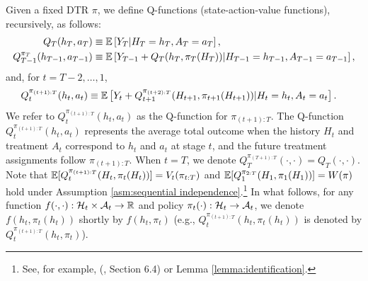 Given a fixed DTR $\pi$, we define Q-functions (state-action-value functions), recursively, as follows:
\begin{align}
    Q_T(h_T,a_T) &\equiv \mathbb{E}\left[Y_{T}|H_T = h_T, A_T = a_T\right], \label{eq:action_value_func_1}\\
     Q_{T-1}^{\pi_{T}}(h_{T-1},a_{T-1}) &\equiv \mathbb{E}\left[Y_{T-1} + Q_T(h_T,\pi_T(H_{T}))|H_{T-1} = h_{T-1}, A_{T-1} = a_{T-1}\right],
     \end{align}
     and, for $t=T-2,\ldots,1$,
     \begin{align}
     Q_{t}^{\pi_{(t+1):T}}(h_t,a_t) &\equiv \mathbb{E}\left[Y_{t} + Q_{t+1}^{\pi_{(t+2):T}}(H_{t+1},\pi_{t+1}(H_{t+1}))|H_t = h_t, A_t = a_t\right]. \label{eq:state_value_func_2}
\end{align}
We refer to $Q_{t}^{\pi_{(t+1):T}}(h_t,a_t)$ as the Q-function for $\pi_{(t+1):T}$. 
The Q-function $Q_{t}^{\pi_{(t+1):T}}(h_t,a_t)$ represents the average total outcome when the history $H_t$ and treatment $A_t$ correspond to $h_t$ and $a_t$ at stage $t$, and the future treatment assignments follow $\pi_{(t+1):T}$. 
When $t=T$, we denote $Q_{T}^{\pi_{(T+1):T}}(\cdot,\cdot) = Q_{T}(\cdot,\cdot)$.  Note that $\mathbb{E}[Q_{t}^{\pi_{(t+1):T}}(H_{t},\pi_{t}(H_{t}))] = V_{t}(\pi_{t:T})$ and $\mathbb{E}[Q_{1}^{\pi_{2:T}}(H_{1},\pi_{1}(H_{1}))] = W(\pi)$ hold under Assumption \ref{asm:sequential independence}.\footnote{See, for example, \citeauthor{Tsiatis_et_al_2019}(\citeyear{Tsiatis_et_al_2019}, Section 6.4) or Lemma \ref{lemma:identification}.} 
In what follows, for any function $f(\cdot,\cdot):\mathcal{H}_{t} \times \mathcal{A}_{t} \rightarrow \mathbb{R}$ and policy $\pi_{t}(\cdot):\mathcal{H}_{t} \rightarrow \mathcal{A}_{t}$, we denote $f(h_{t},\pi_{t}(h_{t}))$ shortly by $f(h_{t},\pi_{t})$ (e.g., $Q_{t}^{\pi_{(t+1):T}}(h_t,\pi_t(h_t))$ is denoted by $Q_{t}^{\pi_{(t+1):T}}(h_t,\pi_t)$).



